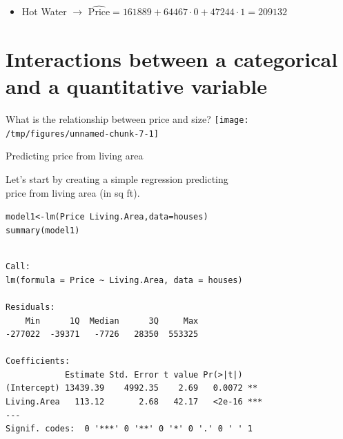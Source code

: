 \documentclass{beamer}\usepackage[]{graphicx}\usepackage[]{color}
\makeatletter
\newcommand{\hlopt}[1]{\textcolor[rgb]{1,0.894,0.769}{#1}}%
\newcommand{\hlstd}[1]{\textcolor[rgb]{1,0.894,0.769}{#1}}%
\newcommand{\hlkwb}[1]{\textcolor[rgb]{0.804,0.776,0.451}{#1}}%
\newcommand{\hlkwc}[1]{\textcolor[rgb]{0.78,0.941,0.545}{#1}}%
\newcommand{\hlkwd}[1]{\textcolor[rgb]{1,0.78,0.769}{#1}}%
\newenvironment{kframe}{%
 \def\at@end@of@kframe{}%
 \ifinner\ifhmode%
  \def\at@end@of@kframe{\end{minipage}}%
  \begin{minipage}{\columnwidth}%
 \fi\fi%
 \def\FrameCommand##1{\hskip\@totalleftmargin \hskip-\fboxsep
 \colorbox{shadecolor}{##1}\hskip-\fboxsep
     \hskip-\linewidth \hskip-\@totalleftmargin \hskip\columnwidth}%
 \MakeFramed {\advance\hsize-\width
   \@totalleftmargin\z@ \linewidth\hsize
   \@setminipage}}%
 {\par\unskip\endMakeFramed%
 \at@end@of@kframe}
\newenvironment{knitrout}{}{} %
\makeatother
\begin{document}
\begin{darkframes}
\begin{frame}
\begin{itemize}[<+->]
        \item Hot Water $\longrightarrow$
        $ \widehat{\text{Price}} = 161889
        + 64467 \cdot 0
        + 47244 \cdot 1 = 209132$
        \end{itemize}
    \end{frame}

    \section{Interactions between a categorical and a quantitative variable}

    \begin{frame}{What is the relationship between price and size?}
\begin{knitrout}
\color{fgcolor}
\texttt{[image: /tmp/figures/unnamed-chunk-7-1]} 

\end{knitrout}
    \end{frame}

    \begin{frame}{Predicting price from living area}
      \begin{center}
        Let's start by creating a simple regression predicting \\
        price from living area (in sq ft).
      \end{center}
    \end{frame}

    \begin{frame}[fragile]
      \fontsize{8}{8}\selectfont
\begin{knitrout}
\color{fgcolor}\begin{kframe}
\begin{alltt}
\hlstd{model1} \hlkwb{<-} \hlkwd{lm}\hlstd{(Price} \hlopt{~} \hlstd{Living.Area,} \hlkwc{data}\hlstd{=houses)}
\hlkwd{summary}\hlstd{(model1)}
\end{alltt}
\begin{verbatim}

Call:
lm(formula = Price ~ Living.Area, data = houses)

Residuals:
    Min      1Q  Median      3Q     Max 
-277022  -39371   -7726   28350  553325 

Coefficients:
            Estimate Std. Error t value Pr(>|t|)    
(Intercept) 13439.39    4992.35    2.69   0.0072 ** 
Living.Area   113.12       2.68   42.17   <2e-16 ***
---
Signif. codes:  0 '***' 0 '**' 0 '*' 0 '.' 0 ' ' 1


\end{verbatim}
\end{kframe}
\end{knitrout}
\end{frame}
\end{darkframes}
\end{document}
